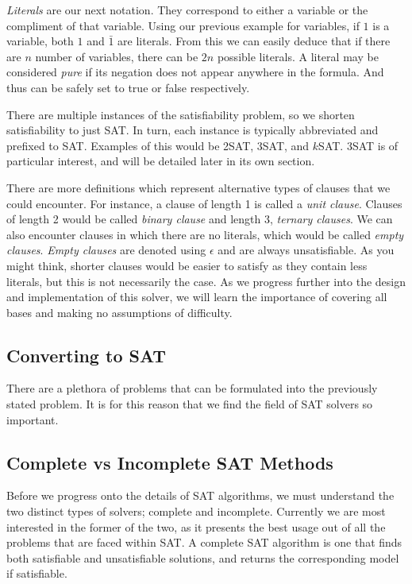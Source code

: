 \documentclass{article}
\begin{document}
\textit{Literals} are our next notation. They correspond to either a variable or the compliment of
that variable. Using our previous example for variables, if $1$ is a variable, both $1$ and
$\bar{1}$ are literals. From this we can easily deduce that if there are $n$ number of variables,
there can be $2n$ possible literals. A literal may be considered \textit{pure} if its negation does
not appear anywhere in the formula. And thus can be safely set to true or false respectively.

There are multiple instances of the satisfiability problem, so we shorten satisfiability to just
SAT. In turn, each instance is typically abbreviated and prefixed to SAT. Examples of this would
be 2SAT, 3SAT, and $k$SAT. 3SAT is of particular interest, and will be detailed later in its own
section.

There are more definitions which represent alternative types of clauses that we could encounter. For  instance, a clause of length 1 is called a \textit{unit clause}. Clauses of length 2
would be called \textit{binary clause} and length 3, \textit{ternary clauses}. We can also
encounter clauses in which there are no literals, which would be called \textit{empty clauses}.
\textit{Empty clauses} are denoted using $\epsilon$ and are always unsatisfiable. As you might
think, shorter clauses would be easier to satisfy as they contain less literals, but this is not
necessarily the case. As we progress further into the design and implementation of this solver, we
will learn the importance of covering all bases and making no assumptions of difficulty.

\subsection{Converting to SAT}
There are a plethora of problems that can be formulated into the previously stated problem. It is
for this reason that we find the field of SAT solvers so important.

\subsection{Complete vs Incomplete SAT Methods}
Before we progress onto the details of SAT algorithms, we must understand the two distinct types of
solvers; complete and incomplete. Currently we are most interested in the former of the two, as it
presents the best usage out of all the problems that are faced within SAT. A complete SAT algorithm
is one that finds both satisfiable and unsatisfiable solutions, and returns the corresponding model
if satisfiable.
\end{document}
